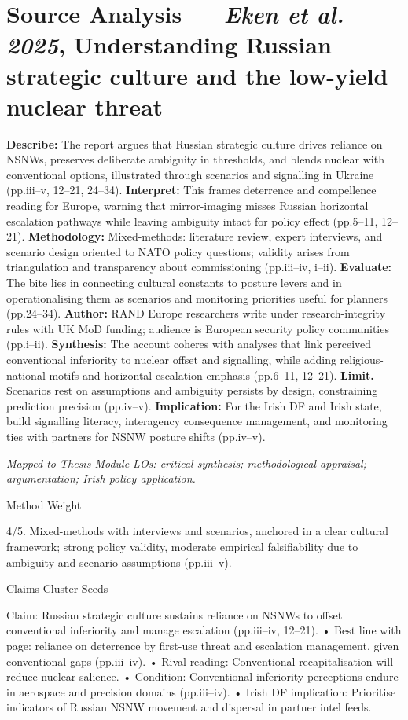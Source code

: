 \section*{Source Analysis — \textit{Eken et al. 2025}, Understanding Russian strategic culture and the low-yield nuclear threat}
\textbf{Describe:} The report argues that Russian strategic culture drives reliance on NSNWs, preserves deliberate ambiguity in thresholds, and blends nuclear with conventional options, illustrated through scenarios and signalling in Ukraine (pp.iii–v, 12–21, 24–34).
\textbf{Interpret:} This frames deterrence and compellence reading for Europe, warning that mirror-imaging misses Russian horizontal escalation pathways while leaving ambiguity intact for policy effect (pp.5–11, 12–21).
\textbf{Methodology:} Mixed-methods: literature review, expert interviews, and scenario design oriented to NATO policy questions; validity arises from triangulation and transparency about commissioning (pp.iii–iv, i–ii).
\textbf{Evaluate:} The bite lies in connecting cultural constants to posture levers and in operationalising them as scenarios and monitoring priorities useful for planners (pp.24–34).
\textbf{Author:} RAND Europe researchers write under research-integrity rules with UK MoD funding; audience is European security policy communities (pp.i–ii).
\textbf{Synthesis:} The account coheres with analyses that link perceived conventional inferiority to nuclear offset and signalling, while adding religious-national motifs and horizontal escalation emphasis (pp.6–11, 12–21).
\textbf{Limit.} Scenarios rest on assumptions and ambiguity persists by design, constraining prediction precision (pp.iv–v). \textbf{Implication:} For the Irish DF and Irish state, build signalling literacy, interagency consequence management, and monitoring ties with partners for NSNW posture shifts (pp.iv–v).

\textit{Mapped to Thesis Module LOs: critical synthesis; methodological appraisal; argumentation; Irish policy application.}

Method Weight

4/5. Mixed-methods with interviews and scenarios, anchored in a clear cultural framework; strong policy validity, moderate empirical falsifiability due to ambiguity and scenario assumptions (pp.iii–v).

Claims-Cluster Seeds

Claim: Russian strategic culture sustains reliance on NSNWs to offset conventional inferiority and manage escalation (pp.iii–iv, 12–21).
• Best line with page: reliance on deterrence by first-use threat and escalation management, given conventional gaps (pp.iii–iv).
• Rival reading: Conventional recapitalisation will reduce nuclear salience.
• Condition: Conventional inferiority perceptions endure in aerospace and precision domains (pp.iii–iv).
• Irish DF implication: Prioritise indicators of Russian NSNW movement and dispersal in partner intel feeds.


